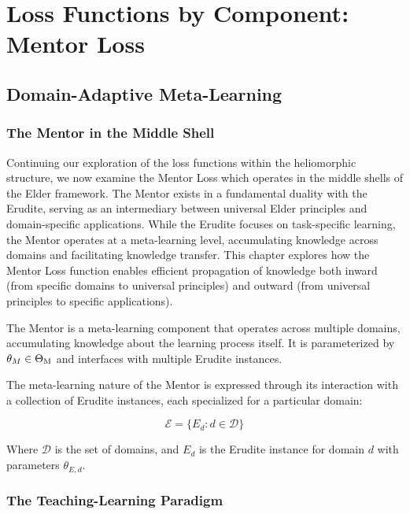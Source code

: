 \chapter{Loss Functions by Component: Mentor Loss}

\section{Domain-Adaptive Meta-Learning}

\subsection{The Mentor in the Middle Shell}

Continuing our exploration of the loss functions within the heliomorphic structure, we now examine the Mentor Loss which operates in the middle shells of the Elder framework. The Mentor exists in a fundamental duality with the Erudite, serving as an intermediary between universal Elder principles and domain-specific applications. While the Erudite focuses on task-specific learning, the Mentor operates at a meta-learning level, accumulating knowledge across domains and facilitating knowledge transfer. This chapter explores how the Mentor Loss function enables efficient propagation of knowledge both inward (from specific domains to universal principles) and outward (from universal principles to specific applications).

\begin{definition}[Mentor]
The Mentor is a meta-learning component that operates across multiple domains, accumulating knowledge about the learning process itself. It is parameterized by $\theta_M \in \Theta_{\text{M}}$ and interfaces with multiple Erudite instances.
\end{definition}

The meta-learning nature of the Mentor is expressed through its interaction with a collection of Erudite instances, each specialized for a particular domain:

\begin{equation}
\mathcal{E} = \{E_d : d \in \mathcal{D}\}
\end{equation}

Where $\mathcal{D}$ is the set of domains, and $E_d$ is the Erudite instance for domain $d$ with parameters $\theta_{E,d}$.

\subsection{The Teaching-Learning Paradigm}

